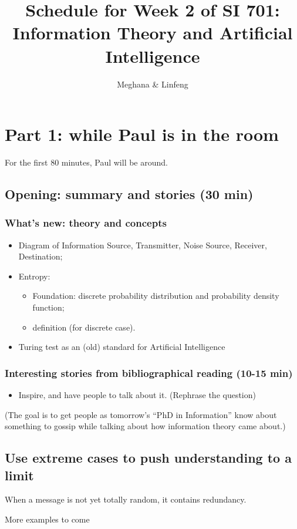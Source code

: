 \documentclass[12pt]{article}
\title{Schedule for Week 2 of SI 701: \\Information Theory and Artificial
Intelligence}
\author{Meghana \& Linfeng }
\theoremstyle{definition}
\theoremstyle{plain}
\begin{document}
\maketitle
\section{Part 1: while Paul is in the room}
For the first 80 minutes, Paul will be around.

\subsection{Opening: summary and stories (30 min)}

\subsubsection{What's new: theory and concepts}
\begin{itemize}
    \item Diagram of Information Source, Transmitter, Noise Source, Receiver,
        Destination;
    \item Entropy:
        \begin{itemize}
            \item Foundation: discrete probability distribution and probability density function;
            \item definition (for discrete case).
        \end{itemize}
    \item Turing test as an (old) standard for Artificial Intelligence
\end{itemize}


\subsubsection{Interesting stories from bibliographical reading (10-15 min)}
\begin{itemize}
    \item Inspire, and have people to talk about it. (Rephrase the question)
\end{itemize}

(The goal is to get people as tomorrow's ``PhD in Information'' know about
something to gossip while talking about how information theory came about.)



\subsection{Use extreme cases to push understanding to a limit}
\begin{example}
    When a message is not yet totally random, it contains redundancy.

    {\Huge More examples to come}
\end{example}
\end{document}
